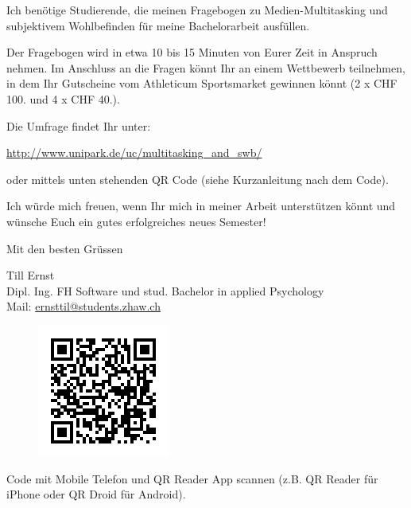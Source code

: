 \begin{RaggedRight}
Ich benötige Studierende, die meinen Fragebogen zu Medien-Multitasking und subjektivem Wohlbefinden für meine Bachelorarbeit ausfüllen.

Der Fragebogen wird in etwa 10 bis 15 Minuten von Eurer Zeit in Anspruch nehmen. Im Anschluss an die Fragen könnt Ihr an einem Wettbewerb teilnehmen, in dem Ihr Gutscheine vom Athleticum Sportsmarket gewinnen könnt (2 x CHF 100.­ und 4 x CHF 40.­).

Die Umfrage findet Ihr unter:

\url{http://www.unipark.de/uc/multitasking_and_swb/}

oder mittels unten stehenden QR Code (siehe Kurzanleitung nach dem Code).

Ich würde mich freuen, wenn Ihr mich in meiner Arbeit unterstützen könnt und wünsche Euch ein gutes erfolgreiches neues Semester!

Mit den besten Grüssen

Till Ernst\\
Dipl. Ing. FH Software und stud. Bachelor in applied Psychology\\
Mail: \href{mailto:ernsttil@students.zhaw.ch}{ernsttil@students.zhaw.ch}\\
\begin{figure}[h]
    \centering
    \includegraphics[scale=0.5]{images/anhang/umfrage_qr_code.png}
\end{figure}
Code mit Mobile ­Telefon und QR ­Reader ­App scannen (z.B. QR Reader für iPhone oder QR Droid für Android).
\end{RaggedRight}